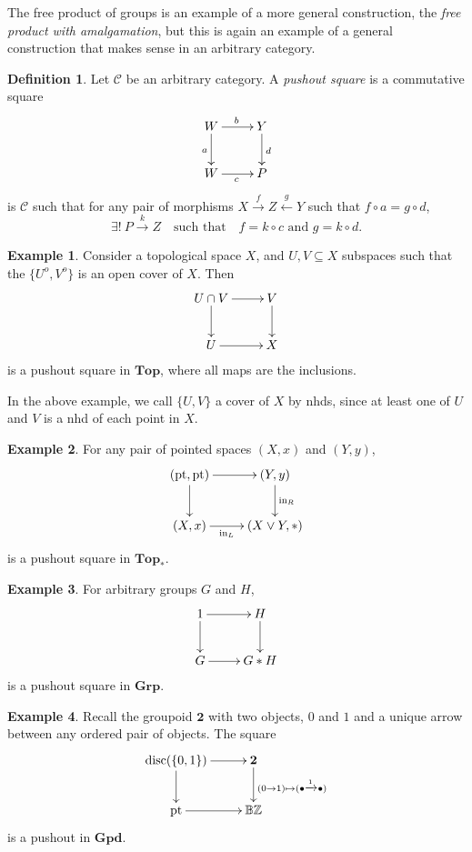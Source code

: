 \documentclass{tufte-handout}
\def\cC {\mathcal{C}}
\def\pt {\mathrm{pt}}
\def\Top {\mathbf{Top}}
\def\Grp {\mathbf{Grp}}
\def\Gpd {\mathbf{Gpd}}
\def\ZZ{\mathbb{Z}}
\DeclareMathOperator{\disc}{disc}
\theoremstyle{definition}
\newtheorem{definition}{Definition}
\newtheorem{example}{Example}
\begin{document}
The free product of groups is an example of a more general construction, the \emph{free product with amalgamation}, but this is again an example of a general construction that makes sense in an arbitrary category.

\begin{definition}
Let $\cC$ be an arbitrary category. A \emph{pushout square} is a commutative square
\[
	\xymatrix{
		W\ar[r]^b \ar[d]_a & Y \ar[d]^d \\
		W \ar[r]_c & P
	}
\]
is $\cC$ such that for any pair of morphisms $X\xrightarrow{f} Z \xleftarrow{g} Y$ such that 
$f\circ a = g\circ d$,
\[
	\exists!\ P\xrightarrow{k} Z \quad \text{such that} \quad  f=k\circ c \text{ and } g=k\circ d.
\]
\end{definition}

\begin{example}
Consider a topological space $X$, and $U,V \subseteq X$ subspaces such that the $\{U^o,V^o\}$ is an open cover of $X$. Then
\[
	\xymatrix{
		U\cap V\ar[r] \ar[d] & V \ar[d] \\
		U \ar[r] & X
	}
\]
is a pushout square in $\Top$, where all maps are the inclusions.
\end{example}

In the above example, we call $\{U,V\}$ a cover of $X$ by nhds, since at least one of $U$ and $V$ is a nhd of each point in $X$.

\begin{example}
For any pair of pointed spaces $(X,x)$ and $(Y,y)$, 
\[
	\xymatrix{
		(\pt,\pt)\ar[r] \ar[d] & (Y,y) \ar[d]^{\mathrm{in}_R} \\
		(X,x) \ar[r]_-{\mathrm{in}_L} & (X\vee Y,\ast)
	}
\]
is a pushout square in $\Top_*$.
\end{example}

\begin{example}
For arbitrary groups $G$ and $H$,
\[
	\xymatrix{
		1\ar[r] \ar[d] & H \ar[d] \\
		G \ar[r] & G\ast H
	}
\]
is a pushout square in $\Grp$.
\end{example}

\begin{example}
Recall the groupoid $\mathbf{2}$ with two objects, $0$ and $1$ and a unique arrow between any ordered pair of objects. The square
\[
	\xymatrix{
		\disc(\{0,1\}) \ar[r] \ar[d] & \mathbf{2}\ar[d]^{(0\to 1)\mapsto (\bullet \xrightarrow{1} \bullet)} \\
		\pt \ar[r]&  \mathbb{B}\ZZ
	}
\]
is a pushout in $\Gpd$.
\end{example}
\end{document}
